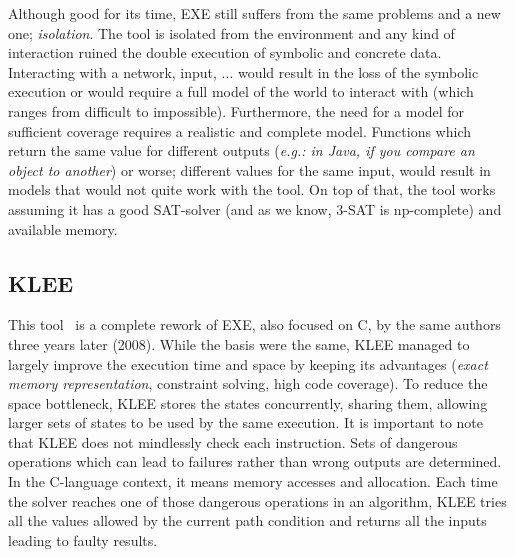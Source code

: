\documentclass[11pt]{IEEEtran}
\begin{document}
      Although good for its time, EXE still suffers from the same problems and a new one; \emph{isolation}. The tool is isolated from the environment and any kind of interaction ruined the double execution of symbolic and concrete data. Interacting with a network, input, ... would result in the loss of the symbolic execution or would require a full model of the world to interact with (which ranges from difficult to impossible). Furthermore, the need for a model for sufficient coverage requires a realistic and complete model. Functions which return the same value for different outputs (\emph{e.g.: in Java, if you compare an object to another}) or worse; different values for the same input, would result in models that would not quite work with the tool. On top of that, the tool works assuming it has a good SAT-solver (and as we know, 3-SAT is np-complete) and available memory.

    \subsection{KLEE}
      \label{subsec:klee}
      This tool~\cite{klee} is a complete rework of EXE, also focused on C, by the same authors three years later (2008). While the basis were the same, KLEE managed to largely improve the execution time and space by keeping its advantages (\emph{exact memory representation}, constraint solving, high code coverage). To reduce the space bottleneck, KLEE stores the states concurrently, sharing them, allowing larger sets of states to be used by the same execution. It is important to note that KLEE does not mindlessly check each instruction. Sets of dangerous operations which can lead to failures rather than wrong outputs are determined. In the C-language context, it means memory accesses and allocation. Each time the solver reaches one of those dangerous operations in an algorithm, KLEE tries all the values allowed by the current path condition and returns all the inputs leading to faulty results.
\end{document}
